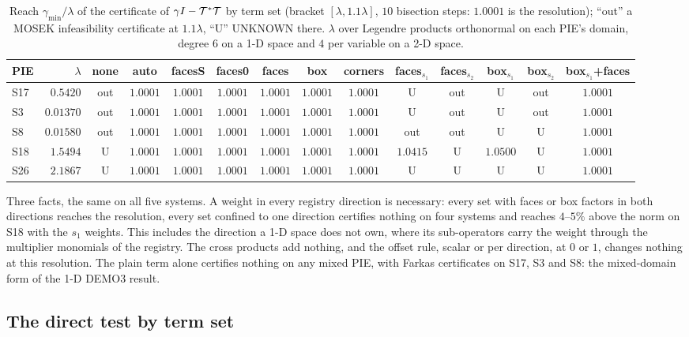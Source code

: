 \begin{table}[h]\centering\scriptsize
\setlength{\tabcolsep}{2.5pt}
\begin{tabular}{lrcccccccccccc}
\toprule
PIE & $\lambda$ & none & auto & facesS & faces0 & faces & box & corners & faces$_{s_1}$ & faces$_{s_2}$ & box$_{s_1}$ & box$_{s_2}$ & box$_{s_1}$+faces \\
\midrule
S17 & $0.5420$ & out & $1.0001$ & $1.0001$ & $1.0001$ & $1.0001$ & $1.0001$ & $1.0001$ & U & out & U & out & $1.0001$ \\
S3 & $0.01370$ & out & $1.0001$ & $1.0001$ & $1.0001$ & $1.0001$ & $1.0001$ & $1.0001$ & U & out & U & out & $1.0001$ \\
S8 & $0.01580$ & out & $1.0001$ & $1.0001$ & $1.0001$ & $1.0001$ & $1.0001$ & $1.0001$ & out & out & U & U & $1.0001$ \\
S18 & $1.5494$ & U & $1.0001$ & $1.0001$ & $1.0001$ & $1.0001$ & $1.0001$ & $1.0001$ & $1.0415$ & U & $1.0500$ & U & $1.0001$ \\
S26 & $2.1867$ & U & $1.0001$ & $1.0001$ & $1.0001$ & $1.0001$ & $1.0001$ & $1.0001$ & U & U & U & U & $1.0001$ \\
\bottomrule
\end{tabular}
\caption{Reach $\gamma_{\min}/\lambda$ of the certificate of $\gamma I-\mathcal{T}^*\mathcal{T}$ by term set (bracket $[\lambda,1.1\lambda]$, $10$ bisection steps: $1.0001$ is the resolution); ``out'' a MOSEK infeasibility certificate at $1.1\lambda$, ``U'' UNKNOWN there. $\lambda$ over Legendre products orthonormal on each PIE's domain, degree $6$ on a 1-D space and $4$ per variable on a 2-D space.}\label{tab:t1}
\end{table}

Three facts, the same on all five systems. A weight in every registry direction is necessary: every set with faces or box factors in both directions reaches the resolution, every set confined to one direction certifies nothing on four systems and reaches $4$--$5\%$ above the norm on S18 with the $s_1$ weights. This includes the direction a 1-D space does not own, where its sub-operators carry the weight through the multiplier monomials of the registry. The cross products add nothing, and the offset rule, scalar or per direction, at $0$ or $1$, changes nothing at this resolution. The plain term alone certifies nothing on any mixed PIE, with Farkas certificates on S17, S3 and S8: the mixed-domain form of the 1-D DEMO3 result.

\subsection{The direct test by term set}\label{sec:t2}


